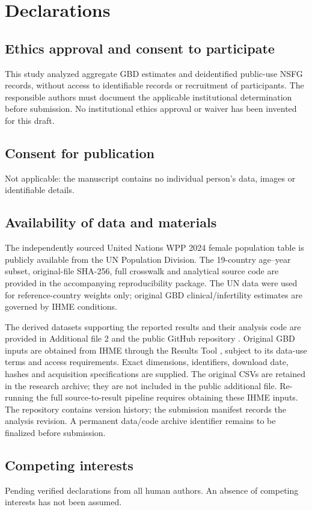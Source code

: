 \documentclass[11pt,a4paper]{article}
\begin{document}
\section*{Declarations}
\subsection*{Ethics approval and consent to participate}
This study analyzed aggregate GBD estimates and deidentified public-use NSFG records, without access to identifiable records or recruitment of participants. The responsible authors must document the applicable institutional determination before submission. No institutional ethics approval or waiver has been invented for this draft.
\subsection*{Consent for publication}
Not applicable: the manuscript contains no individual person's data, images or identifiable details.
\subsection*{Availability of data and materials}
The independently sourced United Nations WPP 2024 female population table is publicly available from the UN Population Division. The 19-country age--year subset, original-file SHA-256, full crosswalk and analytical source code are provided in the accompanying reproducibility package. The UN data were used for reference-country weights only; original GBD clinical/infertility estimates are governed by IHME conditions.

The derived datasets supporting the reported results and their analysis code are provided in Additional file 2 and the public GitHub repository \cite{repository}. Original GBD inputs are obtained from IHME through the Results Tool \cite{results}, subject to its data-use terms and access requirements. Exact dimensions, identifiers, download date, hashes and acquisition specifications are supplied. The original CSVs are retained in the research archive; they are not included in the public additional file. Re-running the full source-to-result pipeline requires obtaining these IHME inputs. The repository contains version history; the submission manifest records the analysis revision. A permanent data/code archive identifier remains to be finalized before submission.
\subsection*{Competing interests}
Pending verified declarations from all human authors. An absence of competing interests has not been assumed.
\end{document}
